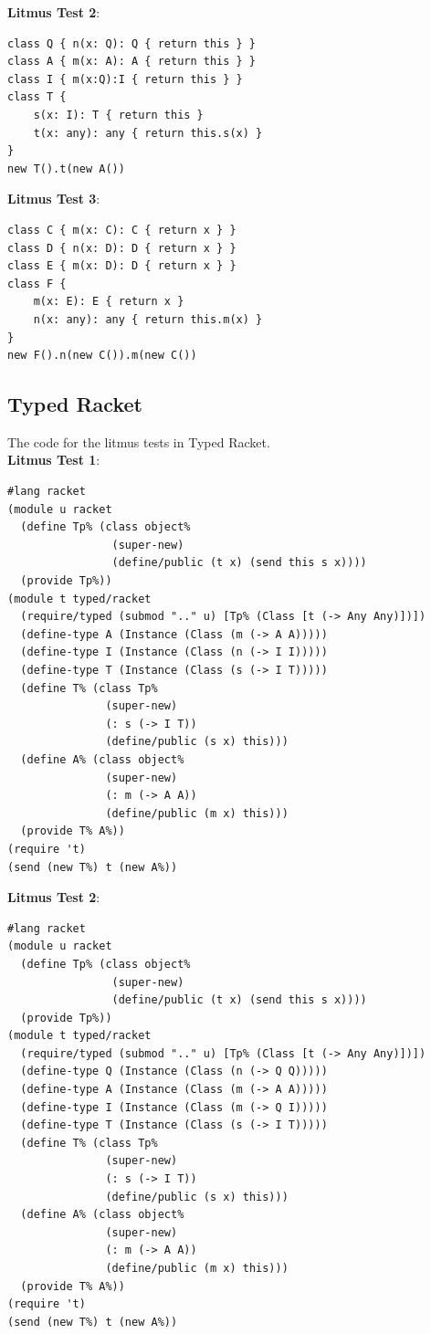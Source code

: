 \documentclass{tex/llncs}
\begin{document}
\noindent\textbf{Litmus Test 2}:
\begin{verbatim}
class Q { n(x: Q): Q { return this } }
class A { m(x: A): A { return this } }
class I { m(x:Q):I { return this } }
class T {
    s(x: I): T { return this }
    t(x: any): any { return this.s(x) }
}
new T().t(new A())
\end{verbatim}

\noindent\textbf{Litmus Test 3}:
\begin{verbatim}
class C { m(x: C): C { return x } }
class D { n(x: D): D { return x } }
class E { m(x: D): D { return x } }
class F {
    m(x: E): E { return x }
    n(x: any): any { return this.m(x) }
}
new F().n(new C()).m(new C())
\end{verbatim}

\subsection*{Typed Racket}

The code for the litmus tests in Typed Racket. \\

\noindent\textbf{Litmus Test 1}:

\begin{verbatim}
#lang racket
(module u racket
  (define Tp% (class object%
                (super-new)
                (define/public (t x) (send this s x))))
  (provide Tp%))
(module t typed/racket
  (require/typed (submod ".." u) [Tp% (Class [t (-> Any Any)])])
  (define-type A (Instance (Class (m (-> A A)))))
  (define-type I (Instance (Class (n (-> I I)))))
  (define-type T (Instance (Class (s (-> I T)))))
  (define T% (class Tp%
               (super-new)
               (: s (-> I T))
               (define/public (s x) this)))
  (define A% (class object%
               (super-new)
               (: m (-> A A))
               (define/public (m x) this)))
  (provide T% A%))
(require 't)
(send (new T%) t (new A%))
\end{verbatim}

\noindent\textbf{Litmus Test 2}:

\begin{verbatim}
#lang racket
(module u racket
  (define Tp% (class object%
                (super-new)
                (define/public (t x) (send this s x))))
  (provide Tp%))
(module t typed/racket
  (require/typed (submod ".." u) [Tp% (Class [t (-> Any Any)])])
  (define-type Q (Instance (Class (n (-> Q Q)))))
  (define-type A (Instance (Class (m (-> A A)))))
  (define-type I (Instance (Class (m (-> Q I)))))
  (define-type T (Instance (Class (s (-> I T)))))
  (define T% (class Tp%
               (super-new)
               (: s (-> I T))
               (define/public (s x) this)))
  (define A% (class object%
               (super-new)
               (: m (-> A A))
               (define/public (m x) this)))
  (provide T% A%))
(require 't)
(send (new T%) t (new A%))
\end{verbatim}
\end{document}
